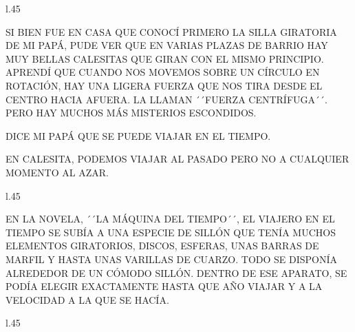 \begin{wrapfigure} [12]{l}{.45\textwidth}\vspace{-1.2cm}%
\end{wrapfigure}

SI BIEN FUE  EN CASA QUE CONOCÍ PRIMERO LA SILLA GIRATORIA DE MI PAPÁ, PUDE VER QUE EN VARIAS PLAZAS DE BARRIO HAY MUY BELLAS CALESITAS QUE GIRAN CON EL MISMO PRINCIPIO. APRENDÍ QUE CUANDO NOS MOVEMOS SOBRE UN CÍRCULO EN ROTACIÓN, HAY UNA LIGERA FUERZA QUE NOS TIRA DESDE EL CENTRO HACIA AFUERA. LA LLAMAN ´´FUERZA CENTRÍFUGA´´. PERO HAY MUCHOS MÁS MISTERIOS ESCONDIDOS. 

DICE MI PAPÁ QUE SE PUEDE VIAJAR EN EL TIEMPO.

\newpage
{}

EN CALESITA, PODEMOS VIAJAR AL PASADO PERO NO A CUALQUIER MOMENTO AL AZAR. 

\begin{wrapfigure} [8]{l}{.45\textwidth}\vspace{-1.2cm}%
\end{wrapfigure}

EN LA NOVELA, ´´LA MÁQUINA DEL TIEMPO´´, EL VIAJERO EN EL TIEMPO SE SUBÍA A UNA ESPECIE DE SILLÓN QUE TENÍA MUCHOS ELEMENTOS GIRATORIOS, DISCOS, ESFERAS, UNAS BARRAS DE MARFIL Y HASTA UNAS VARILLAS DE CUARZO. TODO SE DISPONÍA ALREDEDOR DE UN CÓMODO SILLÓN. DENTRO DE ESE APARATO, SE PODÍA ELEGIR EXACTAMENTE HASTA QUE AÑO VIAJAR Y A LA VELOCIDAD A LA QUE SE HACÍA.  

\newpage
{}
\begin{wrapfigure} [12]{l}{.45\textwidth}\vspace{-1.2cm}%
\end{wrapfigure}
 

